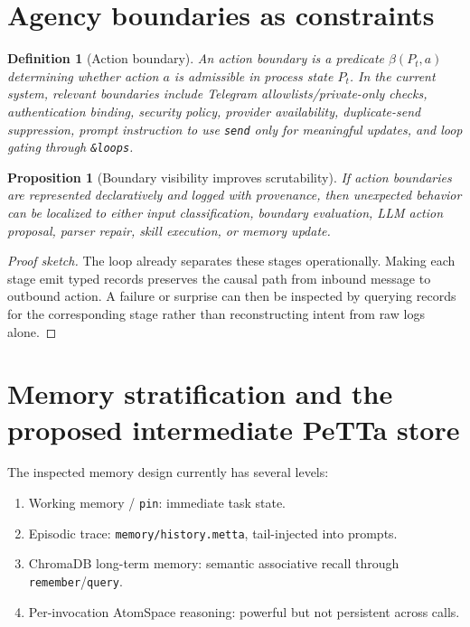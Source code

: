 \documentclass[11pt]{article}
\newtheorem{definition}{Definition}
\newtheorem{proposition}{Proposition}
\begin{document}
\section{Agency boundaries as constraints}

\begin{definition}[Action boundary]
An action boundary is a predicate $\beta(P_t,a)$ determining whether action $a$ is
admissible in process state $P_t$.  In the current system, relevant boundaries include
Telegram allowlists/private-only checks, authentication binding, security policy,
provider availability, duplicate-send suppression, prompt instruction to use
\texttt{send} only for meaningful updates, and loop gating through \texttt{\&loops}.
\end{definition}

\begin{proposition}[Boundary visibility improves scrutability]
If action boundaries are represented declaratively and logged with provenance, then
unexpected behavior can be localized to either input classification, boundary evaluation,
LLM action proposal, parser repair, skill execution, or memory update.
\end{proposition}

\begin{proof}[Proof sketch]
The loop already separates these stages operationally.  Making each stage emit typed
records preserves the causal path from inbound message to outbound action.  A failure
or surprise can then be inspected by querying records for the corresponding stage rather
than reconstructing intent from raw logs alone.
\end{proof}

\section{Memory stratification and the proposed intermediate PeTTa store}

The inspected memory design currently has several levels:
\begin{enumerate}
  \item Working memory / \texttt{pin}: immediate task state.
  \item Episodic trace: \texttt{memory/history.metta}, tail-injected into prompts.
  \item ChromaDB long-term memory: semantic associative recall through \texttt{remember}/\texttt{query}.
  \item Per-invocation AtomSpace reasoning: powerful but not persistent across calls.
\end{enumerate}
\end{document}
